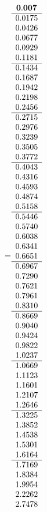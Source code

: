 =\hbox{$\begin{array}{c}
\bf 0.007 
 \\ \hline 
  0.0175 \\ 
  0.0426 \\ 
  0.0677 \\ 
  0.0929 \\ 
  0.1181
 \\ \hline 
  0.1434 \\ 
  0.1687 \\ 
  0.1942 \\ 
  0.2198 \\ 
  0.2456
 \\ \hline 
  0.2715 \\ 
  0.2976 \\ 
  0.3239 \\ 
  0.3505 \\ 
  0.3772
 \\ \hline 
  0.4043 \\ 
  0.4316 \\ 
  0.4593 \\ 
  0.4874 \\ 
  0.5158
 \\ \hline 
  0.5446 \\ 
  0.5740 \\ 
  0.6038 \\ 
  0.6341 \\ 
  0.6651
 \\ \hline 
  0.6967 \\ 
  0.7290 \\ 
  0.7621 \\ 
  0.7961 \\ 
  0.8310
 \\ \hline 
  0.8669 \\ 
  0.9040 \\ 
  0.9424 \\ 
  0.9822 \\ 
  1.0237
 \\ \hline 
  1.0669 \\ 
  1.1123 \\ 
  1.1601 \\ 
  1.2107 \\ 
  1.2646
 \\ \hline 
  1.3225 \\ 
  1.3852 \\ 
  1.4538 \\ 
  1.5301 \\ 
  1.6164
 \\ \hline 
  1.7169 \\ 
  1.8384 \\ 
  1.9954 \\ 
  2.2262 \\ 
  2.7478
 \end{array}$}
